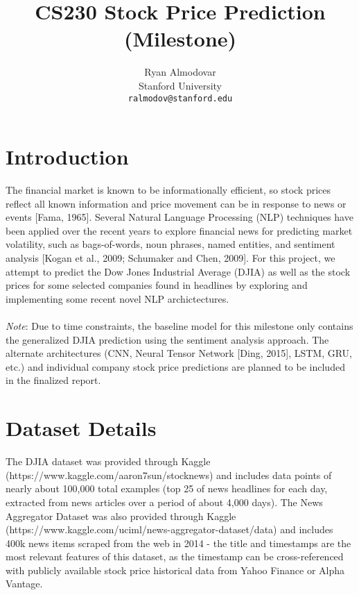 \documentclass{article} %
\title{CS230 Stock Price Prediction (Milestone)}
\author{
Ryan Almodovar \\
Stanford University\\
\texttt{ralmodov@stanford.edu} \\
}
\begin{document}
\maketitle


\section{Introduction}
The financial market is known to be informationally efficient, so stock prices reflect all known
information and price movement can be in response to news or events [Fama, 1965].  
Several Natural Language Processing (NLP) techniques have been applied over the recent years to explore financial news for predicting market volatility,
such as bags-of-words, noun phrases, named entities, and sentiment analysis [Kogan et al., 2009; Schumaker and Chen, 2009].
For this project, we attempt to predict the Dow Jones Industrial Average (DJIA) as well as the stock prices for some selected companies found in headlines by exploring and implementing some recent novel NLP archictectures.
\\
\\
\textit{Note}: Due to time constraints, the baseline model for this milestone only contains the generalized DJIA prediction using the sentiment analysis approach.
The alternate architectures (CNN, Neural Tensor Network [Ding, 2015], LSTM, GRU, etc.)
and individual company stock price predictions are planned to be included in the finalized report.


\section{Dataset Details}

The DJIA dataset was provided through Kaggle (https://www.kaggle.com/aaron7sun/stocknews) and includes data points of nearly
about 100,000 total examples (top 25 of news headlines for each day, extracted from news articles over a period of about 4,000 days).
The News Aggregator Dataset was also provided through Kaggle (https://www.kaggle.com/uciml/news-aggregator-dataset/data) and
includes 400k news items scraped from the web in 2014 - the title and timestamps are the most relevant features of this dataset,
as the timestamp can be cross-referenced with publicly available stock price historical data from Yahoo Finance or Alpha Vantage.
\end{document}
